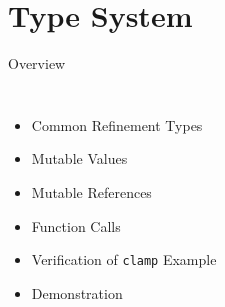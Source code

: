 \documentclass{sdqbeamer}
\newcommand{\code}[1]{\texttt{#1}}
\begin{document}
\section{Type System}

\begin{frame}{Overview}
  \begin{columns}
    \begin{itemize}
      \item Common Refinement Types
      \item Mutable Values
      \item Mutable References
      \item Function Calls 
      \item Verification of \code{clamp} Example
      \item Demonstration
    \end{itemize}

    \inputminted[fontsize=\footnotesize]{rust}{./snippets/clamp-with-spec.rs}
  \end{columns}
\end{frame}
\end{document}
